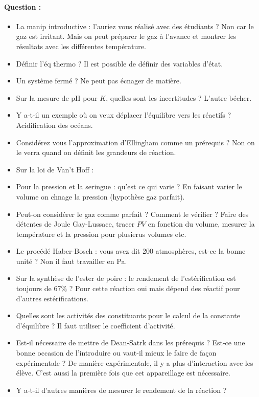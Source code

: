 \paragraph{Question :}
\begin{itemize}
\item La manip introductive : l'auriez vous réalisé avec des étudiants ?
Non car le gaz est irritant.
Mais on peut préparer le gaz à l'avance et montrer les résultats avec les différentes température.
\item Définir l'éq thermo ?
Il est possible de définir des variables d'état.
\item Un système fermé ?
Ne peut pas écnager de matière.
\item Sur la mesure de pH pour $K$, quelles sont les incertitudes ?
L'autre bécher.
\item Y a-t-il un exemple où on veux déplacer l'équilibre vers les réactifs ?
Acidification des océans.
\item Considérez vous l'approximation d'Ellingham comme un prérequis ?
Non on le verra quand on définit les grandeurs de réaction.
\item Sur la loi de Van't Hoff : 
\item Pour la pression et la seringue : qu'est ce qui varie ?
En faisant varier le volume on chnage la pression (hypothèse gaz parfait).
\item Peut-on considérer le gaz comme parfait ? Comment le vérifier ?
Faire des détentes de Joule Gay-Lussace, tracer $PV$ en fonction du volume, mesurer la température et la pression pour plusierus volumes etc.
\item Le procédé Haber-Bosch : vous avez dit 200 atmosphères, est-ce la bonne unité ?
Non il faut travailler en Pa.
\item Sur la synthèse de l'ester de poire : le rendement de l'estérification est toujours de 67\% ?
Pour cette réaction oui mais dépend des réactif pour d'autres estérifications.
\item Quelles sont les activités des constituants pour le calcul de la constante d'équilibre ?
Il faut utiliser le coefficient d'activité.
\item Est-il nécessaire de mettre de Dean-Satrk dans les prérequis ? Est-ce une bonne occasion de l'introduire ou vaut-il mieux le faire de façon expérimentale ?
De manière expérimentale, il y a plus d'interaction avec les élève.
C'est aussi la première fois que cet appareillage est nécessaire.
\item Y a-t-il d'autres manières de mesurer le rendement de la réaction ?

\end{itemize}
